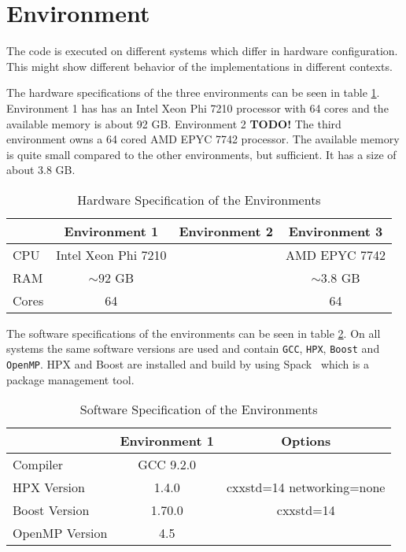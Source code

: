 \section{Environment}
  The code is executed on different systems which differ in hardware configuration.
  This might show different behavior of the implementations in different contexts.

The hardware specifications of the three environments can be seen in table \ref{tab:hardEnv}.
Environment 1 has has an Intel Xeon Phi 7210 processor with 64 cores and the available memory is about 92 GB.
Environment 2 \textbf{TODO!}
The third environment owns a 64 cored AMD EPYC 7742 processor. The available memory is quite small compared to the other environments, but sufficient.
It has a size of about 3.8 GB.
\begin{table}
\centering
\caption{Hardware Specification of the Environments}
\begin{tabular}[h]{l c c c}
 & Environment 1 & Environment 2 & Environment 3  \\\hline
CPU & Intel Xeon Phi 7210 &  & AMD EPYC 7742 \\
RAM & $\sim 92$ GB &  & $\sim 3.8$ GB \\
Cores & 64 &  & 64 \\\hline
\end{tabular}
\label{tab:hardEnv}
\end{table}

The software specifications of the environments can be seen in table \ref{tab:softEnv}.
On all systems the same software versions are used and contain \texttt{GCC}, \texttt{HPX}, \texttt{Boost} and \texttt{OpenMP}.
HPX and Boost are installed and build by using Spack~\cite{Spack.2020} which is a package management tool.
\begin{table}
\centering
\caption{Software Specification of the Environments}
\begin{tabular}[h]{l c c}
\centering
 & Environment 1 & Options\\\hline
Compiler & GCC 9.2.0 & \\
HPX Version & 1.4.0 & cxxstd=14 networking=none  \\
Boost Version & 1.70.0 & cxxstd=14 \\
OpenMP Version & 4.5 & \\\hline
\end{tabular}
\label{tab:softEnv}
\end{table}